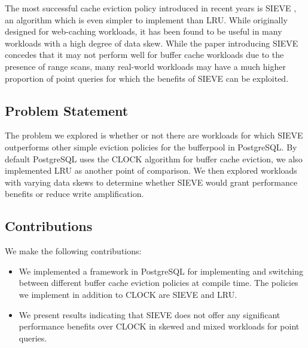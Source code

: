 \documentclass[sigconf]{acmart}
\begin{document}
The most successful cache eviction policy introduced in recent years is SIEVE \cite{SIEVE}, an algorithm which is even simpler to implement than LRU. While originally designed for web-caching workloads, it has been found to be useful in many workloads with a high degree of data skew. While the paper introducing SIEVE concedes that it may not perform well for buffer cache workloads due to the presence of range scans, many real-world workloads may have a much higher proportion of point queries for which the benefits of SIEVE can be exploited.

\subsection{Problem Statement}

The problem we explored is whether or not there are workloads for which SIEVE outperforms other simple eviction policies for the bufferpool in PostgreSQL. By default PostgreSQL uses the CLOCK algorithm for buffer cache eviction, we also implemented LRU as another point of comparison. We then explored workloads with varying data skews to determine whether SIEVE would grant performance benefits or reduce write amplification.

\subsection{Contributions}

We make the following contributions:

\begin{itemize}
    \item We implemented a framework in PostgreSQL for implementing and switching between different buffer cache eviction policies at compile time. The policies we implement in addition to CLOCK are SIEVE and LRU.
    \item We present results indicating that SIEVE does not offer any significant performance benefits over CLOCK in skewed and mixed workloads for point queries.
\end{itemize}


\end{document}
